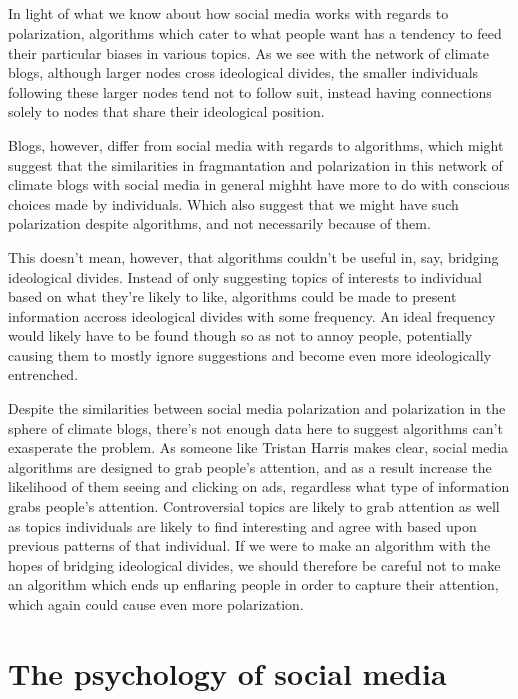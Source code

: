 \documentclass[11pt]{article}
\begin{document}
\subsection{}
In light of what we know about how social media works with regards to polarization,
algorithms which cater to what people want has a tendency to feed their particular
biases in various topics. As we see with the network of climate blogs, although larger
nodes cross ideological divides, the smaller individuals following these larger nodes
tend not to follow suit, instead having connections solely to nodes that share their
ideological position.

Blogs, however, differ from social media with regards to algorithms, which might suggest
that the similarities in fragmantation and polarization in this network of climate blogs
with social media in general mighht have more to do with conscious choices made by
individuals. Which also suggest that we might have such polarization despite algorithms,
and not necessarily because of them.

This doesn't mean, however, that algorithms couldn't be useful in, say, bridging ideological
divides. Instead of only suggesting topics of interests to individual based on what they're
likely to like, algorithms could be made to present information accross ideological
divides with some frequency. An ideal frequency would likely have to be found though so as
not to annoy people, potentially causing them to mostly ignore suggestions and become even
more ideologically entrenched.

Despite the similarities between social media polarization and polarization in the sphere
of climate blogs, there's not enough data here to suggest algorithms can't exasperate
the problem. As someone like Tristan Harris makes clear, social media algorithms are designed
to grab people's attention, and as a result increase the likelihood of them seeing and
clicking on ads, regardless what type of information grabs people's attention.
Controversial topics are likely to grab attention as well as topics individuals are likely
to find interesting and agree with based upon previous patterns of that individual.
If we were to make an algorithm with the hopes of bridging ideological divides, we should
therefore be careful not to make an algorithm which ends up enflaring people in order
to capture their attention, which again could cause even more polarization.

\section{The psychology of social media}
\end{document}
